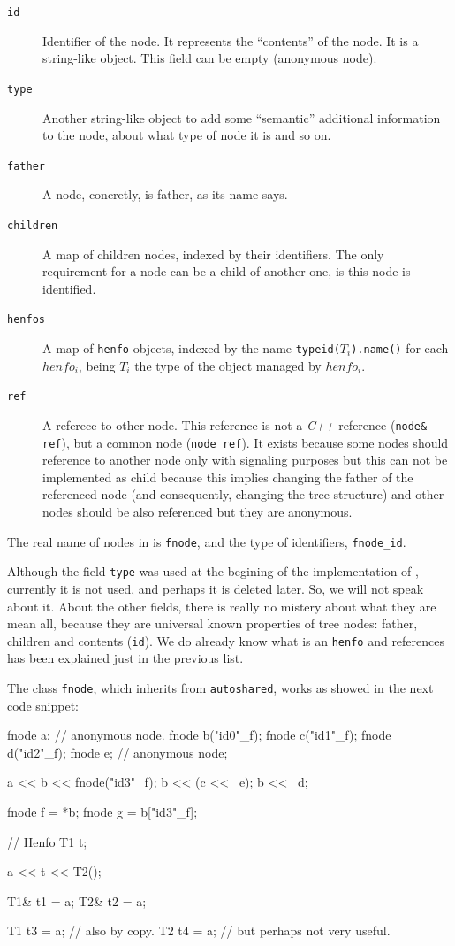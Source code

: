 \documentclass{article}
\begin{document}
\begin{description}
  \item[\texttt{id}] Identifier of the node. It represents the ``contents'' of
    the node. It is a string-like object. This field can be empty (anonymous
    node).
  \item[\texttt{type}] Another string-like object to add some ``semantic''
    additional information to the node, about what type of node it is and so on.
  \item[\texttt{father}] A node, concretly, is father, as its name says.
  \item[\texttt{children}] A map of children nodes, indexed by their
    identifiers. The only requirement for a node can be a child of another one,
    is this node is identified.
  \item[\texttt{henfos}] A map of \texttt{henfo} objects, indexed by the name
    \texttt{typeid($T_i$).name()} for each $henfo_i$, being \texttt{$T_i$} the
    type of the object managed by $henfo_i$.
  \item[\texttt{ref}] A referece to other node. This reference is not a
    \textit{C++} reference (\texttt{node\& ref}), but a common node (\texttt{node
      ref}). It exists because some nodes should reference to another node only
    with signaling purposes but this can not be implemented as child because
    this implies changing the father of the referenced node (and consequently,
    changing the tree structure) and other nodes should be also referenced but
    they are anonymous.
\end{description}

The real name of nodes in \fav is \texttt{fnode}, and the type of identifiers,
\texttt{fnode\_id}.

Although the field \texttt{type} was used at the begining of the implementation
of \faupp, currently it is not used, and perhaps it is deleted later. So, we
will not speak about it. About the other fields, there is really no mistery
about what they are mean all, because they are universal known properties of
tree nodes: father, children and contents (\texttt{id}). We do already know what
is an \texttt{henfo} and references has been explained just in the previous
list.

The class \texttt{fnode}, which inherits from \texttt{autoshared}, works as
showed in the next code snippet:

\begin{Cpp}
  fnode a; // anonymous node.
  fnode b("id0"_f);
  fnode c("id1"_f);
  fnode d("id2"_f);
  fnode e; // anonymous node;

  a << b << fnode("id3"_f);
  b << (c << ~e);
  b << ~d;

  fnode f = *b;
  fnode g = b["id3"_f];

  // Henfo
  T1 t;

  a << t << T2();

  T1& t1 = a;
  T2& t2 = a;

  T1 t3 = a; // also by copy.
  T2 t4 = a; // but perhaps not very useful.
\end{Cpp}
\end{document}
